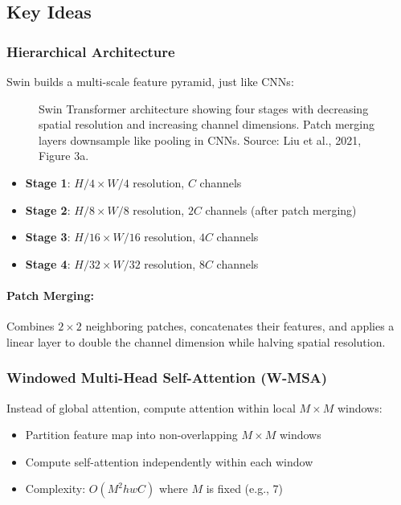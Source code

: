 \documentclass{article}
\begin{document}
\subsection{Key Ideas}

\subsubsection{Hierarchical Architecture}

Swin builds a multi-scale feature pyramid, just like CNNs:

\begin{figure}[h]
\centering
{}
\caption{Swin Transformer architecture showing four stages with decreasing spatial resolution and increasing channel dimensions. Patch merging layers downsample like pooling in CNNs. Source: Liu et al., 2021, Figure 3a.}
\end{figure}

\begin{itemize}
\item \textbf{Stage 1}: $H/4 \times W/4$ resolution, $C$ channels
\item \textbf{Stage 2}: $H/8 \times W/8$ resolution, $2C$ channels (after patch merging)
\item \textbf{Stage 3}: $H/16 \times W/16$ resolution, $4C$ channels
\item \textbf{Stage 4}: $H/32 \times W/32$ resolution, $8C$ channels
\end{itemize}

\paragraph{Patch Merging:} Combines $2 \times 2$ neighboring patches, concatenates their features, and applies a linear layer to double the channel dimension while halving spatial resolution.

\subsubsection{Windowed Multi-Head Self-Attention (W-MSA)}

Instead of global attention, compute attention within local $M \times M$ windows:

\begin{itemize}
\item Partition feature map into non-overlapping $M \times M$ windows
\item Compute self-attention independently within each window
\item Complexity: $O(M^2 hwC)$ where $M$ is fixed (e.g., 7)
\end{itemize}
\end{document}
